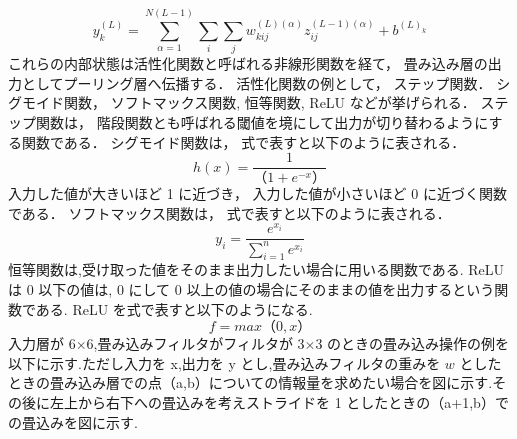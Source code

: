 \begin{equation}
  y^{(L)}_{k} = \sum_{\alpha=1}^{N(L - 1)} \sum_{i} \sum_{j}
     w^{(L)(\alpha)}_{kij} z^{(L - 1)(\alpha)}_{ij}
         + b^{(L)_k}
  \label{eq:OutputInternal}
\end{equation}
これらの内部状態は活性化関数と呼ばれる非線形関数を経て，
畳み込み層の出力としてプーリング層へ伝播する．
活性化関数の例として，
ステップ関数．
シグモイド関数，
ソフトマックス関数,
恒等関数,
 ReLU などが挙げられる．
ステップ関数は，
階段関数とも呼ばれる閾値を境にして出力が切り替わるようにする関数である．
シグモイド関数は，
式で表すと以下のように表される．
\begin{equation}
  h(x) = \frac{1}{（1 + e^{-x}）}
  \label{eq:sigmoid}
\end{equation}
入力した値が大きいほど 1 に近づき，
入力した値が小さいほど 0 に近づく関数である．
ソフトマックス関数は，
式で表すと以下のように表される．
\begin{equation}
  y_i = \frac{e^{x_i}}{\sum_{i=1}^{n}e^{x_i}}
\end{equation}
恒等関数は,受け取った値をそのまま出力したい場合に用いる関数である.
ReLU は 0 以下の値は,
0 にして 0 以上の値の場合にそのままの値を出力するという関数である.
ReLU を式で表すと以下のようになる.
\begin{equation}
　f = max（ 0 , x ）
\end{equation}
入力層が 6×6,畳み込みフィルタがフィルタが 3×3 のときの畳み込み操作の例を以下に示す.ただし入力を x,出力を y とし,畳み込みフィルタの重みを $w$ としたときの畳み込み層での点（a,b）についての情報量を求めたい場合を図に示す.その後に左上から右下への畳込みを考えストライドを 1 としたときの（a+1,b）での畳込みを図に示す.
